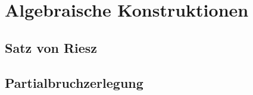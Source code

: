 %
%
%
\section{Algebraische Konstruktionen}

%
%
\subsection{Satz von Riesz}

%
%
\subsection{Partialbruchzerlegung}







